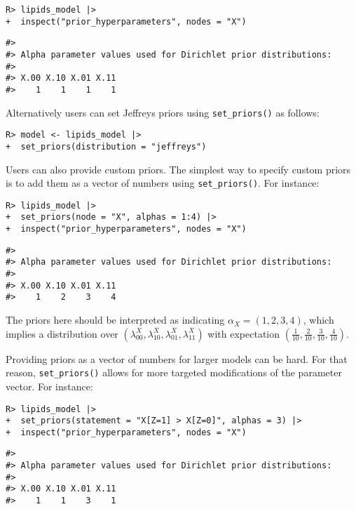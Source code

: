 \documentclass[
  11pt,
  article]{jss}
\begin{document}
\begin{verbatim}
R> lipids_model |> 
+  inspect("prior_hyperparameters", nodes = "X") 
\end{verbatim}

\begin{verbatim}
#> 
#> Alpha parameter values used for Dirichlet prior distributions:
#> 
#> X.00 X.10 X.01 X.11 
#>    1    1    1    1
\end{verbatim}

Alternatively users can set Jeffreys priors using \texttt{set\_priors()}
as follows:

\begin{verbatim}
R> model <- lipids_model |> 
+  set_priors(distribution = "jeffreys")
\end{verbatim}

Users can also provide custom priors. The simplest way to specify custom
priors is to add them as a vector of numbers using
\texttt{set\_priors()}. For instance:

\begin{verbatim}
R> lipids_model |> 
+  set_priors(node = "X", alphas = 1:4) |> 
+  inspect("prior_hyperparameters", nodes = "X")
\end{verbatim}

\begin{verbatim}
#> 
#> Alpha parameter values used for Dirichlet prior distributions:
#> 
#> X.00 X.10 X.01 X.11 
#>    1    2    3    4
\end{verbatim}

The priors here should be interpreted as indicating
\(\alpha_X = (1,2, 3, 4)\), which implies a distribution over
\((\lambda^X_{00},\lambda^X_{10}, \lambda^X_{01}, \lambda^X_{11})\) with
expectation
\(\left(\frac1{10}, \frac2{10}, \frac3{10}, \frac4{10} \right)\).

Providing priors as a vector of numbers for larger models can be hard.
For that reason, \texttt{set\_priors()} allows for more targeted
modifications of the parameter vector. For instance:

\begin{verbatim}
R> lipids_model |>
+  set_priors(statement = "X[Z=1] > X[Z=0]", alphas = 3) |>
+  inspect("prior_hyperparameters", nodes = "X")
\end{verbatim}

\begin{verbatim}
#> 
#> Alpha parameter values used for Dirichlet prior distributions:
#> 
#> X.00 X.10 X.01 X.11 
#>    1    1    3    1
\end{verbatim}
\end{document}
